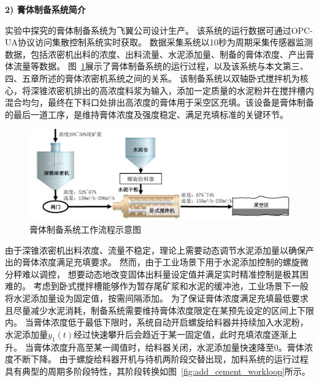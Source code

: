 \textbf{2) 膏体制备系统简介}

实验中探究的膏体制备系统为飞翼公司设计生产。
该系统的运行数据可通过OPC-UA协议访问集散控制系统实时获取。
数据采集系统以10秒为周期采集传感器监测数据，包括浓密机出料的浓度、出料流量、水泥添加量、制备的膏体浓度、产出膏体流量等数据。
图~\ref{fig:paste_system}展示了膏体制备系统的运行过程，以及该系统与本文第三、四、五章所述的膏体浓密机系统之间的关系。
该制备系统以双轴卧式搅拌机为核心，将深锥浓密机排出的高浓度料浆为输入，添加一定质量的水泥粉并在搅拌槽内混合均匀，最终在下料口处排出高浓度的膏体用于采空区充填。该设备是膏体制备的最后一道工序，是维持膏体浓度及强度稳定、满足充填标准的关键环节。

\begin{figure}[!htbp]
  \centering
  \includegraphics[width=\textwidth]{figures/chapter4/paste_system.pdf}
  \caption{膏体制备系统工作流程示意图}
\label{fig:paste_system} 
\end{figure}

由于深锥浓密机出料浓度、流量不稳定，理论上需要动态调节水泥添加量以确保产出的膏体浓度满足充填要求。
然而，由于工业场景下用于水泥添加控制的螺旋微分秤难以调控，
想要动态地改变固体出料量设定值并满足实时精准控制是极其困难的。
考虑到卧式搅拌槽能够作为暂存尾矿浆和水泥的缓冲池，工业场景下一般将水泥添加量设为固定值，按需间隔添加。
为了保证膏体浓度满足充填最低要求且尽量减少水泥消耗，制备系统需要维持膏体浓度限定在某预先设定的区间上下限内。
当膏体浓度低于最低下限时，系统自动开启螺旋给料器并持续加入水泥粉，
水泥添加量$y_1(t)$经过快速攀升后会趋近于某一固定值，此时充填浓度逐渐上升。
当膏体浓度升高至某一阈值时，给料器关闭，水泥添加量快速降至0。膏体浓度不断下降。
由于螺旋给料器开机与待机两阶段交替出现，加料系统的运行过程具有典型的周期多阶段特性，其阶段转换如图~\ref{fig:add_cement_workloop}所示。 

